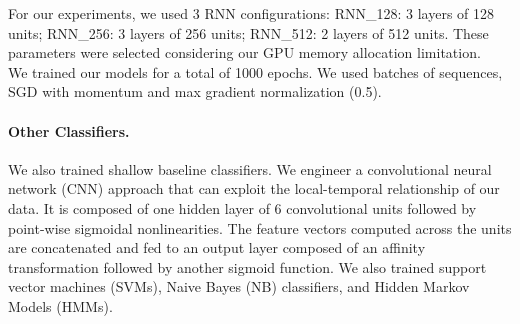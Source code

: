 \documentclass{llncs}
\begin{document}
For  our experiments, we used 3 RNN configurations: RNN\_128: 3 layers of 128 units;  RNN\_256: 3 layers of 256 units; RNN\_512: 2 layers of 512  units. These parameters were selected considering our GPU memory allocation limitation.\\
We trained our models for a total of 1000 epochs. We used batches of sequences, SGD with momentum and max gradient normalization (0.5).

\vspace*{-\baselineskip}
\paragraph{Other Classifiers.} We also trained shallow baseline classifiers. {\color{red} We engineer a convolutional neural network (CNN) approach that can exploit the local-temporal relationship of our data}.  It is composed of one hidden layer of 6 convolutional units followed by point-wise sigmoidal nonlinearities. The feature vectors computed across the units are concatenated and fed to an output layer composed of an affinity transformation followed by another sigmoid function. We also trained support vector machines ({SVMs}), Naive Bayes ({NB}) classifiers, and Hidden Markov Models ({HMMs}). %
\vspace*{-\baselineskip}
\end{document}
